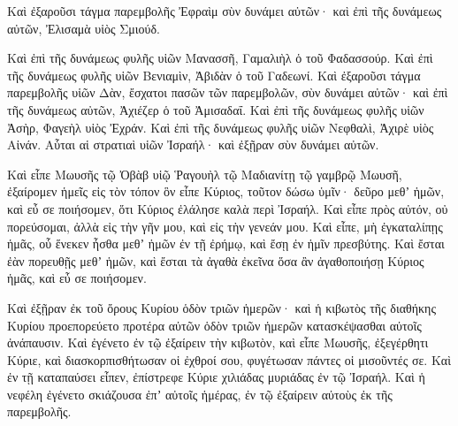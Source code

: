 {Καὶ ἐξαροῦσι τάγμα παρεμβολῆς Ἐφραὶμ σὺν δυνάμει αὐτῶν· καὶ ἐπὶ τῆς δυνάμεως αὐτῶν, Ἐλισαμὰ υἱὸς Σμιούδ.
\par }{\PP {}Καὶ ἐπὶ τῆς δυνάμεως φυλῆς υἱῶν Μανασσῆ, Γαμαλιὴλ ὁ τοῦ Φαδασσούρ.
Καὶ ἐπὶ τῆς δυνάμεως φυλῆς υἱῶν Βενιαμὶν, Ἀβιδὰν ὁ τοῦ Γαδεωνί.
Καὶ ἐξαροῦσι τάγμα παρεμβολῆς υἱῶν Δὰν, ἔσχατοι πασῶν τῶν παρεμβολῶν, σὺν δυνάμει αὐτῶν· καὶ ἐπὶ τῆς δυνάμεως αὐτῶν, Ἀχιέζερ ὁ τοῦ Ἀμισαδαΐ.
Καὶ ἐπὶ τῆς δυνάμεως φυλῆς υἱῶν Ἀσὴρ, Φαγεὴλ υἱὸς Ἐχράν.
Καὶ ἐπὶ τῆς δυνάμεως φυλῆς υἱῶν Νεφθαλὶ, Ἀχιρὲ υἱὸς Αἰνάν.
Αὗται αἱ στρατιαὶ υἱῶν Ἰσραήλ· καὶ ἐξῇραν σὺν δυνάμει αὐτῶν.
\par }{\PP {}Καὶ εἶπε Μωυσῆς τῷ Ὀβὰβ υἱῷ Ῥαγουὴλ τῷ Μαδιανίτῃ τῷ γαμβρῷ Μωυσῆ, ἐξαίρομεν ἡμεῖς εἰς τὸν τόπον ὃν εἶπε Κύριος, τοῦτον δώσω ὑμῖν· δεῦρο μεθʼ ἡμῶν, καὶ εὖ σε ποιήσομεν, ὅτι Κύριος ἐλάλησε καλὰ περὶ Ἰσραήλ.
Καὶ εἶπε πρὸς αὐτόν, οὐ πορεύσομαι, ἀλλὰ εἰς τὴν γῆν μου, καὶ εἰς τὴν γενεάν μου.
Καὶ εἶπε, μὴ ἐγκαταλίπῃς ἡμᾶς, οὗ ἕνεκεν ἦσθα μεθʼ ἡμῶν ἐν τῇ ἐρήμῳ, καὶ ἔσῃ ἐν ἡμῖν πρεσβύτης.
Καὶ ἔσται ἐὰν πορευθῇς μεθʼ ἡμῶν, καὶ ἔσται τὰ ἀγαθὰ ἐκεῖνα ὅσα ἂν ἀγαθοποιήσῃ Κύριος ἡμᾶς, καὶ εὖ σε ποιήσομεν.
\par }{\PP {}Καὶ ἐξῇραν ἐκ τοῦ ὄρους Κυρίου ὁδὸν τριῶν ἡμερῶν· καὶ ἡ κιβωτὸς τῆς διαθήκης Κυρίου προεπορεύετο προτέρα αὐτῶν ὁδὸν τριῶν ἡμερῶν κατασκέψασθαι αὐτοῖς ἀνάπαυσιν.
Καὶ ἐγένετο ἐν τῷ ἐξαίρειν τὴν κιβωτὸν, καὶ εἶπε Μωυσῆς, ἐξεγέρθητι Κύριε, καὶ διασκορπισθήτωσαν οἱ ἐχθροί σου, φυγέτωσαν πάντες οἱ μισοῦντές σε.
Καὶ ἐν τῇ καταπαύσει εἶπεν, ἐπίστρεφε Κύριε χιλιάδας μυριάδας ἐν τῷ Ἰσραήλ.
Καὶ ἡ νεφέλη ἐγένετο σκιάζουσα ἐπʼ αὐτοῖς ἡμέρας, ἐν τῷ ἐξαίρειν αὐτοὺς ἐκ τῆς παρεμβολῆς.

}
